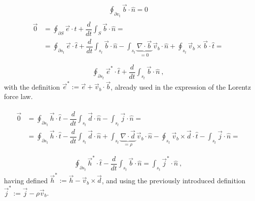 \documentclass[letterpaper,10pt,english]{jupyterBook}
\begin{document}
\sphinxAtStartPar
{}
\begin{equation*}
\begin{split}
    \oint_{\partial v_t} \vec{b} \cdot \hat{n} = 0
\end{split}
\end{equation*}
\sphinxAtStartPar
{}
\begin{equation*}
\begin{split}\begin{aligned}
   \vec{0} & = \oint_{\partial S} \vec{e} \cdot \hat{t} + \dfrac{d}{dt} \int_{S} \vec{b} \cdot \hat{n} = \\
    & = \oint_{\partial s_t} \vec{e} \cdot \hat{t} + \dfrac{d}{dt} \int_{s_t} \vec{b} \cdot \hat{n} - \int_{s_t} \underbrace{\nabla \cdot \vec{b}}_{=0} \, \vec{v}_b \cdot \hat{n} + \oint_{s_t} \vec{v}_b \times \vec{b} \cdot \hat{t} =  \\
\end{aligned}\end{split}
\end{equation*}\begin{equation*}
\begin{split}
    \oint_{\partial s_t} \vec{e}^* \cdot \hat{t} + \dfrac{d}{dt} \int_{s_t} \vec{b} \cdot \hat{n} \ ,
\end{split}
\end{equation*}
\sphinxAtStartPar
with the definition \(\vec{e}^* := \vec{e} + \vec{v}_b \cdot \vec{b}\), already used in the expression of the Lorentz force law.

\sphinxAtStartPar
{}
\begin{equation*}
\begin{split}\begin{aligned}
    \vec{0} & = \oint_{\partial s_t} \vec{h} \cdot \hat{t} - \dfrac{d}{dt} \int_{s_t} \vec{d} \cdot \hat{n} - \int_{s_t} \vec{j} \cdot \hat{n} = \\
    & = \oint_{\partial s_t} \vec{h} \cdot \hat{t} - \dfrac{d}{dt} \int_{s_t} \vec{d} \cdot \hat{n} + \int_{s_t} \underbrace{\nabla \cdot \vec{d}}_{=\rho} \, \vec{v}_b \cdot \hat{n} - \oint_{s_t} \vec{v}_b \times \vec{d} \cdot \hat{t} - \int_{s_t} \vec{j} \cdot \hat{n} =  \\
\end{aligned}\end{split}
\end{equation*}\begin{equation*}
\begin{split}
    \oint_{\partial s_t} \vec{h}^* \cdot \hat{t} - \dfrac{d}{dt} \int_{s_t} \vec{b} \cdot \hat{n} = \int_{s_t} \vec{j}^* \cdot \hat{n} \ ,
\end{split}
\end{equation*}
\sphinxAtStartPar
having defined \(\vec{h}^* := \vec{h} - \vec{v}_b \times \vec{d}\), and using the previously introduced definition \(\vec{j}^* := \vec{j} - \rho \vec{v}_b\).
\end{document}
